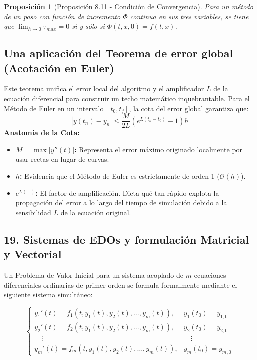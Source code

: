 \documentclass[12pt]{article}
\newtheorem{proposicion}{Proposición}
\begin{document}
\begin{proposicion}[Proposición 8.11 - Condición de Convergencia]
Para un método de un paso con función de incremento $\Phi$ continua en sus tres variables, se tiene que $\lim_{h \to 0} \tau_{max} = 0$ si y sólo si $\Phi(t, x, 0) = f(t, x)$.
\end{proposicion}

\subsection*{Una aplicación del Teorema de error global (Acotación en Euler)}
Este teorema unifica el error local del algoritmo y el amplificador $L$ de la ecuación diferencial para construir un techo matemático inquebrantable. Para el Método de Euler en un intervalo $[t_0, t_f]$, la cota del error global garantiza que:
\begin{equation}
    |y(t_n) - y_n| \le \frac{M}{2L} \left( e^{L(t_n - t_0)} - 1 \right) h
\end{equation}
\textbf{Anatomía de la Cota:}
\begin{itemize}
    \item \textbf{$M = \max|y''(t)|$:} Representa el error máximo originado localmente por usar rectas en lugar de curvas.
    \item \textbf{$h$:} Evidencia que el Método de Euler es estrictamente de orden 1 ($\mathcal{O}(h)$).
    \item \textbf{$e^{L(\dots)}$:} El factor de amplificación. Dicta qué tan rápido explota la propagación del error a lo largo del tiempo de simulación debido a la sensibilidad $L$ de la ecuación original.
\end{itemize}


\subsection*{19. Sistemas de EDOs y formulación Matricial y Vectorial}
Un Problema de Valor Inicial para un sistema acoplado de $m$ ecuaciones diferenciales ordinarias de primer orden se formula formalmente mediante el siguiente sistema simultáneo:

\begin{equation}
\begin{cases}
    y_1'(t) = f_1(t, y_1(t), y_2(t), \dots, y_m(t)), & y_1(t_0) = y_{1,0} \\
    y_2'(t) = f_2(t, y_1(t), y_2(t), \dots, y_m(t)), & y_2(t_0) = y_{2,0} \\
    \quad \vdots & \quad \vdots \\
    y_m'(t) = f_m(t, y_1(t), y_2(t), \dots, y_m(t)), & y_m(t_0) = y_{m,0}
\end{cases}
\end{equation}
\end{document}

